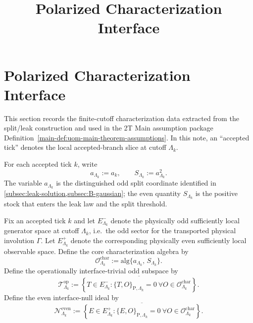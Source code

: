 \documentclass[11pt]{article}
\title{Polarized Characterization Interface}
\author{}
\date{}
\begin{document}
\maketitle
\fi

\section{Polarized Characterization Interface}
\label{sec:char-export}

This section records the finite-cutoff characterization data extracted from the split/leak
construction and used in the 2T Main assumption package
Definition~\ref{main-def:uom-main-theorem-assumptions}. In this note, an ``accepted tick'' denotes the local
accepted-branch slice at cutoff \(\Lambda_k\).

For each accepted tick \(k\), write
\[
a_{\Lambda_k}:=a_k,
\qquad
S_{\Lambda_k}:=a_{\Lambda_k}^2.
\]
The variable \(a_{\Lambda_k}\) is the distinguished odd split coordinate identified in
\cref{subsec:leak-solution,subsec:B-gaussian}; the even quantity \(S_{\Lambda_k}\) is the
positive stock that enters the leak law and the split threshold.

\begin{definition}
\label{def:char-data}
Fix an accepted tick \(k\) and let \(E^-_{\Lambda_k}\) denote the physically odd sufficiently local
generator space at cutoff \(\Lambda_k\), i.e.\ the odd sector for the transported physical involution
\(\Gamma\). Let \(E^+_{\Lambda_k}\) denote the corresponding physically even sufficiently local
observable space.
Define the core characterization algebra by
\begin{equation}
\mathcal O^{\mathrm{char}}_{\Lambda_k}
:=
\mathrm{alg}\{a_{\Lambda_k},\,S_{\Lambda_k}\}.
\label{eq:Ochar-def}
\end{equation}
Define the operationally interface-trivial odd subspace by
\begin{equation}
\mathcal T^{\mathrm{op}}_{\Lambda_k}
:=
\overline{\left\{
T\in E^-_{\Lambda_k}:
\{T,O\}_{\mathrm P,\Lambda_k}=0
\ \forall O\in\mathcal O^{\mathrm{char}}_{\Lambda_k}
\right\}}.
\label{eq:Tchar-def}
\end{equation}
Define the even interface-null ideal by
\begin{equation}
\mathcal N^{\mathrm{even}}_{\Lambda_k}
:=
\overline{\left\{
E\in E^+_{\Lambda_k}:
\{E,O\}_{\mathrm P,\Lambda_k}=0
\ \forall O\in\mathcal O^{\mathrm{char}}_{\Lambda_k}
\right\}}.
\label{eq:Neven-def}
\end{equation}
\end{definition}
\end{document}
